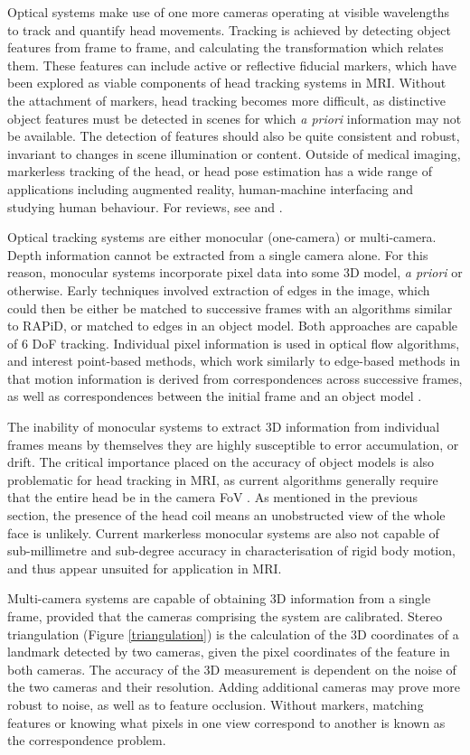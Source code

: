 \documentclass[class=article, crop=false]{standalone}
\begin{document}
Optical systems make use of one more cameras operating at visible wavelengths to track and quantify head movements. Tracking is achieved by detecting object features from frame to frame, and calculating the transformation which relates them. These features can include active or reflective fiducial markers, which have been explored as viable components of head tracking systems in MRI. Without the attachment of markers, head tracking becomes more difficult, as distinctive object features must be detected in scenes for which \textit{a priori} information may not be available. The detection of features should also be quite consistent and robust, invariant to changes in scene illumination or content. Outside of medical imaging, markerless tracking of the head, or head pose estimation has a wide range of applications including augmented reality, human-machine interfacing and studying human behaviour. For reviews, see \parencite{Murphy-Chutorian2009} and \parencite{Lepetit2005}.
\par
Optical tracking systems are either monocular (one-camera) or multi-camera. Depth information cannot be extracted from a single camera alone. For this reason, monocular systems incorporate pixel data into some 3D model, \textit{a priori} or otherwise. Early techniques involved extraction of edges in the image, which could then be either be matched to successive frames with an algorithms similar to RAPiD, or matched to edges in an object model. Both approaches are capable of 6 DoF tracking. Individual pixel information is used in optical flow algorithms, and interest point-based methods, which work similarly to edge-based methods in that motion information is derived from correspondences across successive frames, as well as correspondences between the initial frame and an object model \parencite{Ravela1995}.
\par  
The inability of monocular systems to extract 3D information from individual frames means by themselves they are highly susceptible to error accumulation, or drift. The critical importance placed on the accuracy of object models is also problematic for head tracking in MRI, as current algorithms generally require that the entire head be in the camera FoV \parencite{Jeni2017a,Jourabloo2016,Zhu2016,Dong2016,Gu2006}. As mentioned in the previous section, the presence of the head coil means an unobstructed view of the whole face is unlikely. Current markerless monocular systems are also not capable of sub-millimetre and sub-degree accuracy in characterisation of rigid body motion, and thus appear unsuited for application in MRI.
\par
Multi-camera systems are capable of obtaining 3D information from a single frame, provided that the cameras comprising the system are calibrated. Stereo triangulation (Figure \ref{triangulation}) is the calculation of the 3D coordinates of a landmark detected by two cameras, given the pixel coordinates of the feature in both cameras. The accuracy of the 3D measurement is dependent on the noise of the two cameras and their resolution. Adding additional cameras may prove more robust to noise, as well as to feature occlusion. Without markers, matching features or knowing what pixels in one view correspond to another is known as the correspondence problem.
\end{document}
